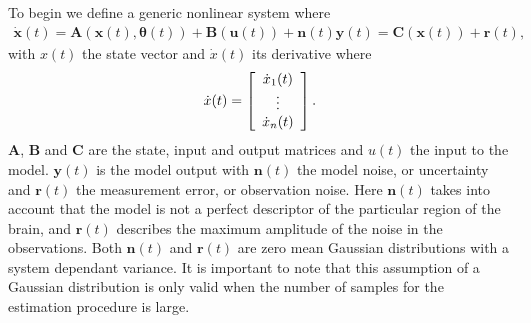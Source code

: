 To begin we define a generic nonlinear system where \begin{align}
\mathbf{\dot{x}}(t) = \mathbf{A}(\mathbf{x}(t),\mathbf{\theta}(t)) + \mathbf{B}(\mathbf{u}(t)) + \mathbf{n}(t)
\mathbf{y}(t)  = \mathbf{C}(\mathbf{x}(t)) +\mathbf{r}(t),
\end{align} with $x(t)$ the state vector and $\dot{x}(t)$ its derivative where
\[ \dot{x}(t) = \left[ \begin{array}[pos]{c}
\dot{x}_{1}(t)\\
\vdots \\
\dot{x}_{n}(t) \end{array} \right] .\]  $\mathbf{A}$, $\mathbf{B}$ and $\mathbf{C}$ are the state, input and output matrices and $u(t)$ the input to the model. $\mathbf{y}(t)$ is the model output with $\mathbf{n}(t)$ the model noise, or uncertainty and $\mathbf{r}(t)$ the measurement error, or observation noise. Here $\mathbf{n}(t)$ takes into account that the model is not a perfect descriptor of the particular region of the brain, and $\mathbf{r}(t)$ describes the maximum amplitude of the noise in the observations. Both $\mathbf{n}(t)$ and $\mathbf{r}(t)$ are zero mean Gaussian distributions with a system dependant variance. It is important to note that this assumption of a Gaussian distribution is only valid when the number of samples for the estimation procedure is large.

